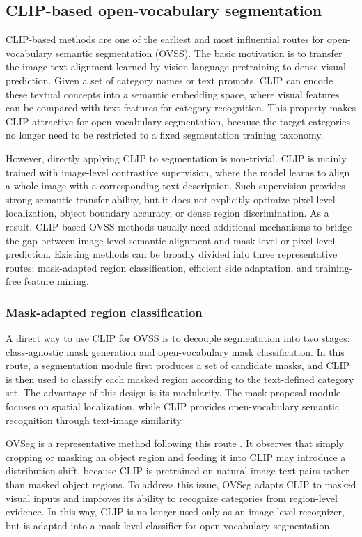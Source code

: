 \subsection{CLIP-based open-vocabulary segmentation}
\label{subsec:clip_based_ovss}

CLIP-based methods are one of the earliest and most influential routes for open-vocabulary semantic segmentation (OVSS). 
The basic motivation is to transfer the image-text alignment learned by vision-language pretraining to dense visual prediction. 
Given a set of category names or text prompts, CLIP can encode these textual concepts into a semantic embedding space, where visual features can be compared with text features for category recognition. 
This property makes CLIP attractive for open-vocabulary segmentation, because the target categories no longer need to be restricted to a fixed segmentation training taxonomy.

However, directly applying CLIP to segmentation is non-trivial. 
CLIP is mainly trained with image-level contrastive supervision, where the model learns to align a whole image with a corresponding text description. 
Such supervision provides strong semantic transfer ability, but it does not explicitly optimize pixel-level localization, object boundary accuracy, or dense region discrimination. 
As a result, CLIP-based OVSS methods usually need additional mechanisms to bridge the gap between image-level semantic alignment and mask-level or pixel-level prediction. 
Existing methods can be broadly divided into three representative routes: mask-adapted region classification, efficient side adaptation, and training-free feature mining.

\subsubsection{Mask-adapted region classification}

A direct way to use CLIP for OVSS is to decouple segmentation into two stages: class-agnostic mask generation and open-vocabulary mask classification. 
In this route, a segmentation module first produces a set of candidate masks, and CLIP is then used to classify each masked region according to the text-defined category set. 
The advantage of this design is its modularity. 
The mask proposal module focuses on spatial localization, while CLIP provides open-vocabulary semantic recognition through text-image similarity.

OVSeg is a representative method following this route \cite{Liang2023}. 
It observes that simply cropping or masking an object region and feeding it into CLIP may introduce a distribution shift, because CLIP is pretrained on natural image-text pairs rather than masked object regions. 
To address this issue, OVSeg adapts CLIP to masked visual inputs and improves its ability to recognize categories from region-level evidence. 
In this way, CLIP is no longer used only as an image-level recognizer, but is adapted into a mask-level classifier for open-vocabulary segmentation.


